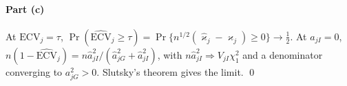 \paragraph{Part (c)}
At $\mathrm{ECV}_j=\tau$, $\Pr(\widehat{\mathrm{ECV}}_j\ge\tau)=\Pr\{n^{1/2}(\widehat\varkappa_j-\varkappa_j)\ge0\}\to\tfrac12$. At $a_{jI}=0$, $n(1-\widehat{\mathrm{ECV}}_j)=n\widehat a_{jI}^2/(\widehat a_{jG}^2+\widehat a_{jI}^2)$, with $n\widehat a_{jI}^2\Rightarrow V_{jI}\chi^2_1$ and a denominator converging to $a_{jG}^2>0$. Slutsky's theorem gives the limit. \qed
